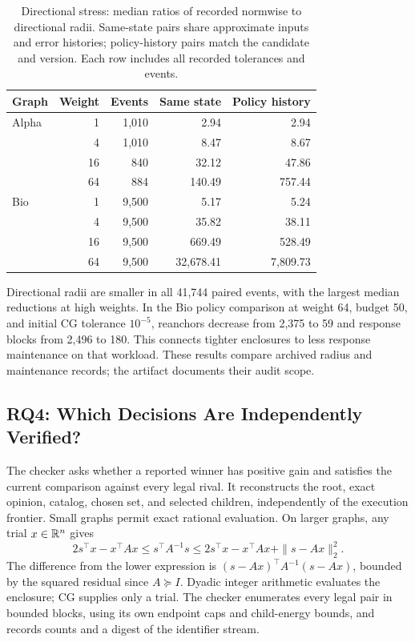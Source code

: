 \begin{table}[t]
\centering
\caption{Directional stress: median ratios of recorded normwise to directional radii. Same-state pairs share approximate inputs and error histories; policy-history pairs match the candidate and version. Each row includes all recorded tolerances and events.}
\label{tab:directional}
\begin{tabular}{lrrrr}
\toprule
Graph & Weight & Events & Same state & Policy history\\
\midrule
Alpha & 1 & 1,010 & 2.94 & 2.94\\
      & 4 & 1,010 & 8.47 & 8.67\\
      & 16 & 840 & 32.12 & 47.86\\
      & 64 & 884 & 140.49 & 757.44\\
Bio   & 1 & 9,500 & 5.17 & 5.24\\
      & 4 & 9,500 & 35.82 & 38.11\\
      & 16 & 9,500 & 669.49 & 528.49\\
      & 64 & 9,500 & 32,678.41 & 7,809.73\\
\bottomrule
\end{tabular}
\end{table}

Directional radii are smaller in all 41,744 paired events, with the largest median reductions at high weights. In the Bio policy comparison at weight 64, budget 50, and initial CG tolerance $10^{-5}$, reanchors decrease from 2,375 to 59 and response blocks from 2,496 to 180. This connects tighter enclosures to less response maintenance on that workload. These results compare archived radius and maintenance records; the artifact documents their audit scope.

\subsection{RQ4: Which Decisions Are Independently Verified?}
\label{sec:completion}
The checker asks whether a reported winner has positive gain and satisfies the current comparison against every legal rival. It reconstructs the root, exact opinion, catalog, chosen set, and selected children, independently of the execution frontier. Small graphs permit exact rational evaluation. On larger graphs, any trial $x\in\mathbb R^n$ gives
\begin{equation}
 2s^\top x-x^\top Ax\le s^\top A^{-1}s
 \le2s^\top x-x^\top Ax+\|s-Ax\|_2^2.
 \label{eq:checker-energy}
\end{equation}
The difference from the lower expression is $(s-Ax)^\top A^{-1}(s-Ax)$, bounded by the squared residual since $A\succeq I$. Dyadic integer arithmetic evaluates the enclosure; CG supplies only a trial. The checker enumerates every legal pair in bounded blocks, using its own endpoint caps and child-energy bounds, and records counts and a digest of the identifier stream.

